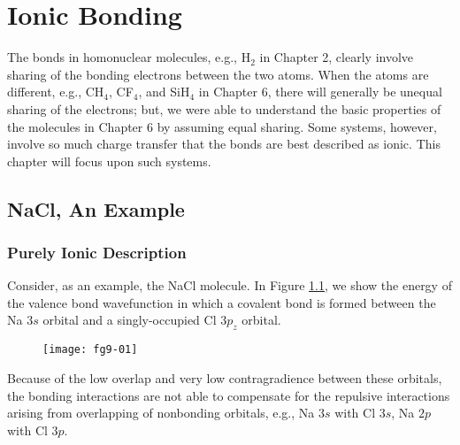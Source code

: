 \chapter{Ionic Bonding}

The bonds in homonuclear molecules, e.g., H$_2$ in Chapter 2, clearly involve 
sharing of the bonding electrons between the two atoms.  When the atoms are 
different, e.g., CH$_4$, CF$_4$, and SiH$_4$ in Chapter 6, there will 
generally be unequal sharing of the electrons; but, we were
able to understand the basic properties of the molecules in Chapter 6 by 
assuming equal sharing.  Some systems, however, involve so much charge 
transfer that the bonds are best described as ionic.  This chapter will 
focus upon such systems.

\section{NaCl, An Example}

\subsection{Purely Ionic Description}

Consider, as an example, the NaCl molecule.  In Figure
\ref{chap9-fig1}, we show the energy of the valence bond wavefunction
in which a covalent bond is formed between the Na $3s$ orbital and a
singly-occupied Cl $3p_z$ orbital.


\begin{figure}
\texttt{[image: fg9-01]}
\caption{}
\label{chap9-fig1}
\end{figure}

Because of the low overlap and very low contragradience between
these orbitals, the bonding interactions are not able to compensate for the 
repulsive interactions arising from overlapping of nonbonding 
orbitals, e.g., Na $3s$ with Cl $3s$, Na $2p$ with Cl $3p$.

